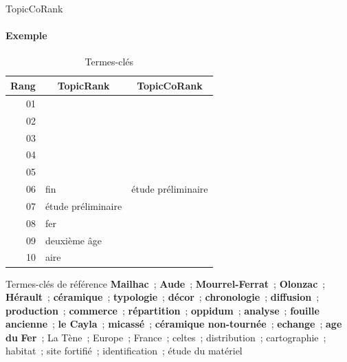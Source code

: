 \begin{frame}{TopicCoRank}\framesubtitle{Exemple}
  \begin{table}
      \centering
      \begin{tabular}{r|l|l}
        \toprule
        \textbf{Rang} & \multicolumn{1}{c|}{\textbf{TopicRank}} & \multicolumn{1}{c}{\textbf{TopicCoRank}} \\
        \hline
        01 & \cellcolor{termithorange!30}{décors} & \cellcolor{termithorange!30}{céramique} \\
        02 & \cellcolor{termithorange!30}{céramique} & \cellcolor{termithorange!30}{décors} \\
        03 & \cellcolor{termithorange!30}{chronologie} & \cellcolor{termithorange!30}{typologie} \\
        04 & \cellcolor{termithorange!30}{typologie} & \cellcolor{termithorange!30}{chronologie} \\
        05 & \cellcolor{termithorange!30}{production} & \cellcolor{termithorange!30}{production} \\
        06 & fin & étude préliminaire \\
        07 & étude préliminaire & \cellcolor{termithorange!30}{diffusion} \\
        08 & fer & \cellcolor{Cerulean!30}{analyse} \\
        09 & deuxième âge & \cellcolor{Cerulean!30}{France} \\
        10 & aire & \cellcolor{termithorange!30}{répartition} \\
        \bottomrule
      \end{tabular}

      \caption{Termes-clés}
    \end{table}

    \begin{exampleblock}{\small Termes-clés de référence}\justifying\small
      \textbf{Mailhac}~; \textbf{Aude}~; \textbf{Mourrel-Ferrat}~;
      \textbf{Olonzac}~; \textbf{Hérault}~; \textbf{céramique}~;
      \textbf{typologie}~; \textbf{décor}~; \textbf{chronologie}~;
      \textbf{diffusion}~; \textbf{production}~; \textbf{commerce}~;
      \textbf{répartition}~; \textbf{oppidum}~; \textbf{analyse}~;
      \textbf{fouille ancienne}~; \textbf{le Cayla}~;
      \textbf{micassé}~; \textbf{céramique non-tournée}~;
      \textbf{echange}~; \textbf{age du} \textbf{Fer}~; La Tène~;
      Europe~; France~; celtes~; distribution~; cartographie~; habitat~; site
      fortifié~; identification~; étude du matériel
    \end{exampleblock}
\end{frame}

